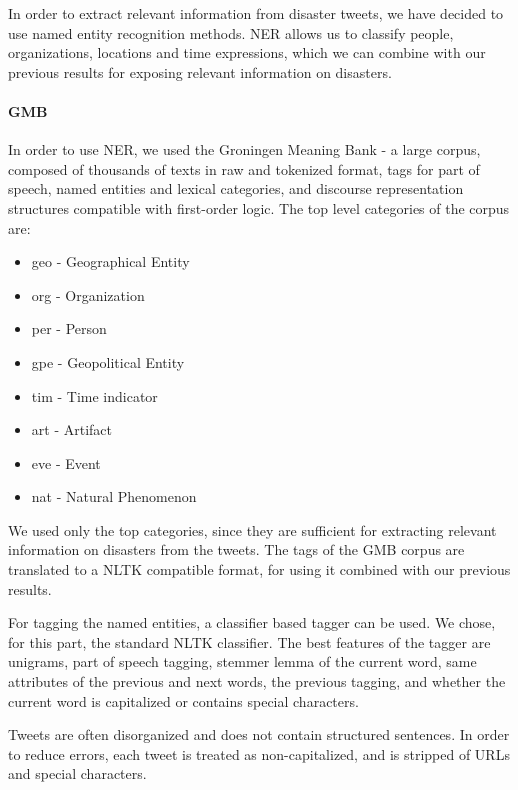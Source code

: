 \documentclass[letterpaper,twocolumn,10pt]{article}
\begin{document}
In order to extract relevant information from disaster tweets, we have decided to use named entity recognition methods. NER allows us to classify people, organizations, locations and time expressions, which we can combine with our previous results for exposing relevant information on disasters.

\paragraph{GMB} In order to use NER, we used the Groningen Meaning Bank - a large corpus, composed of thousands of texts in raw and tokenized format, tags for part of speech, named entities and lexical categories, and discourse representation structures compatible with first-order logic. The top level categories of the corpus are:
\begin{itemize}[noitemsep, nolistsep]
	\item geo - Geographical Entity
	\item org - Organization
	\item per - Person
	\item gpe - Geopolitical Entity
	\item tim - Time indicator
	\item art - Artifact
	\item eve - Event
	\item nat - Natural Phenomenon
\end{itemize}
We used only the top categories, since they are sufficient for extracting relevant information on disasters from the tweets. The tags of the GMB corpus are translated to a NLTK compatible format, for using it combined with our previous results.

For tagging the named entities, a classifier based tagger can be used. We chose, for this part, the standard NLTK classifier. The best features of the tagger are unigrams, part of speech tagging, stemmer lemma of the current word, same attributes of the previous and next words, the previous tagging, and whether the current word is capitalized or contains special characters.

Tweets are often disorganized and does not contain structured sentences. In order to reduce errors, each tweet is treated as non-capitalized, and is stripped of URLs and special characters.
\end{document}
